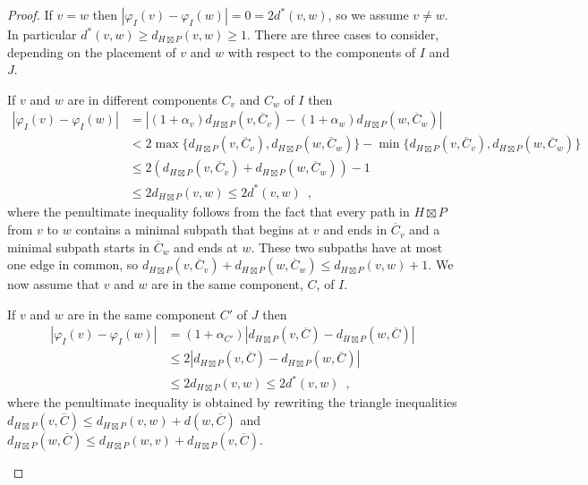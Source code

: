 \documentclass{patmorin}
\renewcommand{\ge}{\geqslant}
\renewcommand{\le}{\leqslant}
\newcommand{\pat}[1]{\textcolor{Blue}{Pat: #1}}
\begin{document}
\begin{proof}
  If $v=w$ then $|\varphi_I(v)-\varphi_I(w)|=0 = 2 d^*(v,w)$, so we assume $v\neq w$. In particular $d^*(v,w)\ge d_{H\boxtimes P}(v,w)\ge 1$.
  There are three cases to consider, depending on the placement of $v$ and $w$ with respect to the components of $I$ and $J$.

  \begin{compactenum}
    \item  If $v$ and $w$ are in different components $C_v$ and $C_w$ of $I$ then
    \begin{align*}
       |\varphi_I(v)-\varphi_I(w)|
      & =|(1+\alpha_v)d_{H\boxtimes P}(v,\overline{C}_v)-(1+\alpha_w)d_{H\boxtimes P}(w,\overline{C}_w)| \\
      & < 2\max\{d_{H\boxtimes P}(v,\overline{C}_v), d_{H\boxtimes P}(w,\overline{C}_w)\}
      - \min\{d_{H\boxtimes P}(v,\overline{C}_v), d_{H\boxtimes P}(w,\overline{C}_w)\} \\
      & \le 2\left(d_{H\boxtimes P}(v,\overline{C}_v) + d_{H\boxtimes P}(w,\overline{C}_w)\right) - 1\\
      & \le 2d_{H\boxtimes P}(v,w) \le 2d^*(v,w) \enspace ,
    \end{align*}
    where the penultimate inequality follows from the fact that every path in $H\boxtimes P$ from $v$ to $w$ contains a minimal subpath that begins at $v$ and ends in $\overline{C}_v$ and a minimal subpath starts in $\overline{C}_w$ and ends at $w$.  These two subpaths have at most one edge in common, so
    $d_{H\boxtimes P}(v,\overline{C}_v) + d_{H\boxtimes P}(w,\overline{C}_w) \le d_{H\boxtimes P}(v,w)+1$.  We now  assume that $v$ and $w$ are in the same component, $C$, of $I$.

    \item If $v$ and $w$ are in the same component $C'$ of $J$ then
    \begin{align*}
      |\varphi_I(v)-\varphi_I(w)|
      & =(1+\alpha_{C'})|d_{H\boxtimes P}(v,\overline{C})-d_{H\boxtimes P}(w,\overline{C})| \\
      & \le 2|d_{H\boxtimes P}(v,\overline{C})-d_{H\boxtimes P}(w,\overline{C})| \\
      & \le 2 d_{H\boxtimes P}(v,w) \le 2d^*(v,w) \enspace ,
    \end{align*}
    where the penultimate inequality is obtained by rewriting the triangle inequalities $d_{H\boxtimes P}(v,\overline{C})\le d_{H\boxtimes P}(v,w)+d(w,\overline{C})$ and $d_{H\boxtimes P}(w,\overline{C})\le d_{H\boxtimes P}(w,v)+d_{H\boxtimes P}(v,\overline{C})$.


\end{compactenum}
\end{proof}
\end{document}

